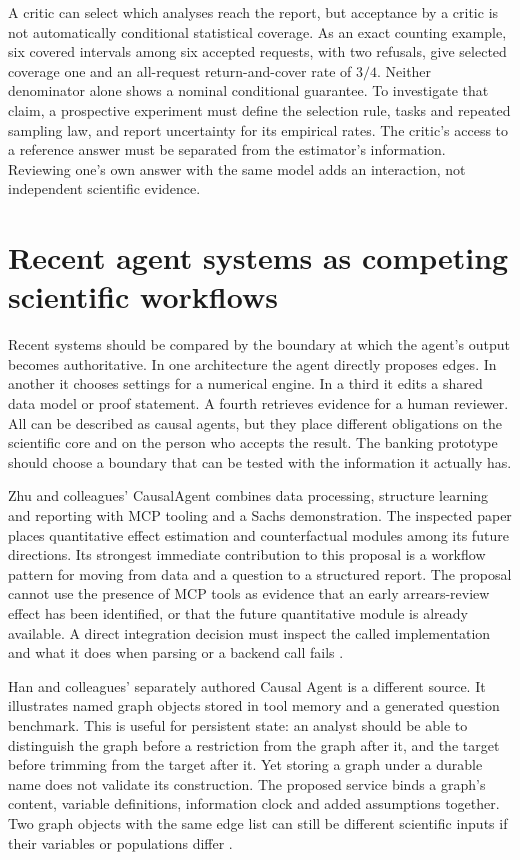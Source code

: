 A critic can select which analyses reach the report, but acceptance by a critic
is not automatically conditional statistical coverage. As an exact counting
example, six covered intervals among six accepted requests, with two refusals,
give selected coverage one and an all-request return-and-cover rate of $3/4$.
Neither denominator alone shows a nominal conditional guarantee. To investigate
that claim, a prospective experiment must define the selection rule, tasks and
repeated sampling law, and report uncertainty for its empirical rates. The
critic's access to a reference answer must be separated from the estimator's
information. Reviewing one's own answer with the same model adds an interaction,
not independent scientific evidence.

\section{Recent agent systems as competing scientific workflows}

Recent systems should be compared by the boundary at which the agent's output
becomes authoritative. In one architecture the agent directly proposes edges.
In another it chooses settings for a numerical engine. In a third it edits a
shared data model or proof statement. A fourth retrieves evidence for a human
reviewer. All can be described as causal agents, but they place different
obligations on the scientific core and on the person who accepts the result.
The banking prototype should choose a boundary that can be tested with the
information it actually has.

Zhu and colleagues' CausalAgent combines data processing, structure learning and
reporting with MCP tooling and a Sachs demonstration. The inspected paper places
quantitative effect estimation and counterfactual modules among its future
directions. Its strongest immediate contribution to this proposal is a
workflow pattern for moving from data and a question to a structured report.
The proposal cannot use the presence of MCP tools as evidence that an early
arrears-review effect has been identified, or that the future quantitative
module is already available. A direct integration decision must inspect the
called implementation and what it does when parsing or a backend call fails
\citep{v12_la_2602_11527,exec13_data_causalagent_code}.

Han and colleagues' separately authored Causal Agent is a different source.
It illustrates named graph objects stored in tool memory and a generated
question benchmark. This is useful for persistent state: an analyst should be
able to distinguish the graph before a restriction from the graph after it,
and the target before trimming from the target after it. Yet storing a graph
under a durable name does not validate its construction. The proposed service
binds a graph's content, variable definitions, information clock and added
assumptions together. Two graph objects with the same edge list can still be
different scientific inputs if their variables or populations differ
\citep{exec13_census_causal_agent}.


